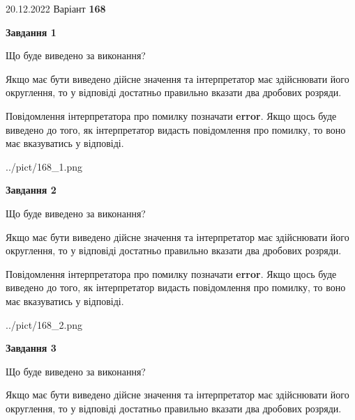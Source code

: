 \documentclass[12pt, ukrainian]{article}
\begin{document}
{20.12.2022 Варіант \No \textbf { 168 }\par}
{
\begin {Large}

{\begin {center}\textbf{Завдання 1}\end {center}}\par
Що буде виведено за виконання? \par

Якщо має бути виведено дійсне значення та інтерпретатор має здійснювати його округлення, 
то у відповіді достатньо правильно вказати два дробових розряди.

Повідомлення інтерпретатора про помилку позначати \textbf{error}.
Якщо щось буде виведено до того, як інтерпретатор видасть повідомлення про помилку, 
то воно має вказуватись у відповіді. \par

\begin{center}
	{../pict/168_1.png}
\end{center}
\newpage

{\begin {center}\textbf{Завдання 2}\end {center}}\par
Що буде виведено за виконання? \par

Якщо має бути виведено дійсне значення та інтерпретатор має здійснювати його округлення, 
то у відповіді достатньо правильно вказати два дробових розряди.

Повідомлення інтерпретатора про помилку позначати \textbf{error}.
Якщо щось буде виведено до того, як інтерпретатор видасть повідомлення про помилку, 
то воно має вказуватись у відповіді. \par

\begin{center}
	{../pict/168_2.png}
\end{center}
\newpage

{\begin {center}\textbf{Завдання 3}\end {center}}\par
Що буде виведено за виконання? \par

Якщо має бути виведено дійсне значення та інтерпретатор має здійснювати його округлення, 
то у відповіді достатньо правильно вказати два дробових розряди.


\end{Large}}
\end{document}
